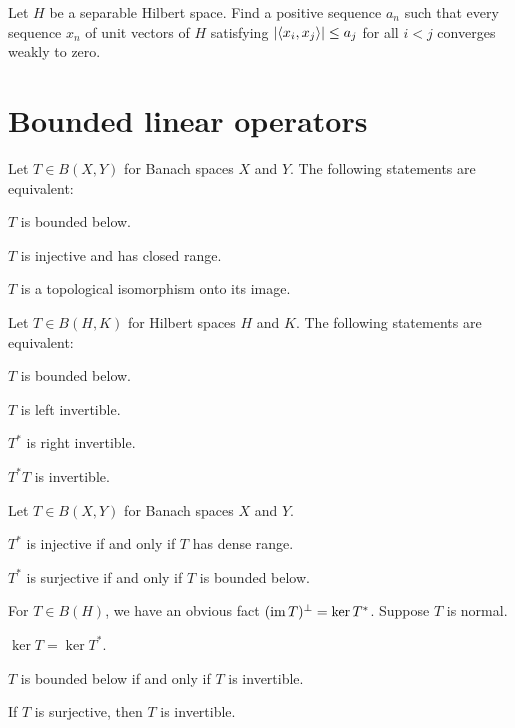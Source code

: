 \documentclass{../../large}
\begin{document}
Let $H$ be a separable Hilbert space.
Find a positive sequence $a_n$ such that every sequence $x_n$ of unit vectors of $H$ satisfying $|\langle x_i,x_j\rangle|\le a_j$ for all $i<j$ converges weakly to zero.









\chapter{Bounded linear operators}
\begin{prb}
Let $T\in B(X,Y)$ for Banach spaces $X$ and $Y$.
The following statements are equivalent:
\begin{parts}
\item $T$ is bounded below.
\item $T$ is injective and has closed range.
\item $T$ is a topological isomorphism onto its image.
\end{parts}
\end{prb}

\begin{prb}
Let $T\in B(H,K)$ for Hilbert spaces $H$ and $K$.
The following statements are equivalent:
\begin{parts}
\item $T$ is bounded below.
\item $T$ is left invertible.
\item $T^*$ is right invertible.
\item $T^*T$ is invertible.
\end{parts}
\end{prb}

\begin{prb}
Let $T\in B(X,Y)$ for Banach spaces $X$ and $Y$.
\begin{parts}
\item $T^*$ is injective if and only if $T$ has dense range.
\item $T^*$ is surjective if and only if $T$ is bounded below.
\end{parts}
\end{prb}

\begin{prb}
For $T\in B(H)$, we have an obvious fact $(\operatorname{im} T)^\perp=\ker T^*$.
Suppose $T$ is normal.
\begin{parts}
\item $\ker T=\ker T^*$.
\item $T$ is bounded below if and only if $T$ is invertible.
\item If $T$ is surjective, then $T$ is invertible.
\end{parts}
\end{prb}
\end{document}
